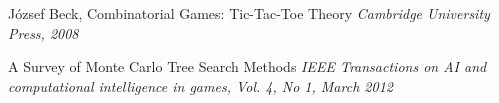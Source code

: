 \begin{thebibliography}{9}


József Beck, Combinatorial Games: Tic-Tac-Toe Theory
\emph{Cambridge University Press, 2008}

A Survey of Monte Carlo Tree Search Methods
\emph{IEEE Transactions on AI and computational intelligence in games, Vol. 4, No 1, March 2012}

\end{thebibliography}
